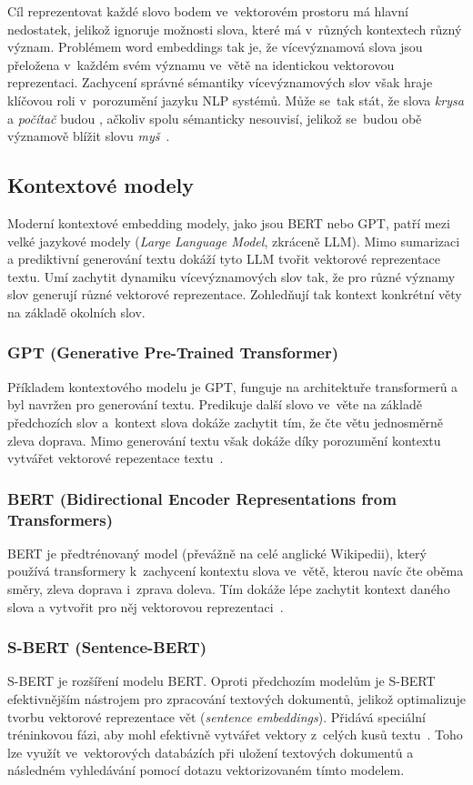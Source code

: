 Cíl reprezentovat každé slovo bodem ve~vektorovém prostoru má hlavní nedostatek, jelikož ignoruje možnosti slova, které má v~různých kontextech různý význam. Problémem word embeddings tak je, že vícevýznamová slova jsou přeložena v~každém svém významu ve~větě na identickou vektorovou reprezentaci. Zachycení správné sémantiky vícevýznamových slov však hraje klíčovou roli v~porozumění jazyku NLP systémů. Může se~tak stát, že slova \textit{krysa} a \textit{počítač} budou , ačkoliv spolu sémanticky nesouvisí, jelikož se~budou obě významově blížit slovu \textit{myš}~\cite{camacho-collados2018_word_sense_embeddings}.

\subsection{Kontextové modely}
Moderní kontextové embedding modely, jako jsou BERT nebo GPT, patří mezi velké jazykové modely (\textit{Large Language Model}, zkráceně LLM). Mimo sumarizaci a prediktivní generování textu dokáží tyto LLM tvořit vektorové reprezentace textu. Umí zachytit dynamiku vícevýznamových slov tak, že pro různé významy slov generují různé vektorové reprezentace. Zohledňují tak kontext konkrétní věty na základě okolních slov.

\subsubsection{GPT (Generative Pre-Trained Transformer)}
Příkladem kontextového modelu je GPT, funguje na architektuře transformerů a byl navržen pro generování textu. Predikuje další slovo ve~věte na základě předchozích slov a~kontext slova dokáže zachytit tím, že čte větu jednosměrně zleva doprava. Mimo generování textu však dokáže díky porozumění kontextu vytvářet vektorové repezentace textu~\cite{yenduri2023_gpt_review}.

\subsubsection{BERT (Bidirectional Encoder Representations from Transformers)}
BERT je předtrénovaný model (převážně na celé anglické Wikipedii), který používá transformery k~zachycení kontextu slova ve~větě, kterou navíc čte oběma směry, zleva doprava i~zprava doleva. Tím dokáže lépe zachytit kontext daného slova a vytvořit pro něj vektorovou reprezentaci~\cite{devlin2018_bert}.

\subsubsection{S-BERT (Sentence-BERT)}
S-BERT je rozšíření modelu BERT. Oproti předchozím modelům je S-BERT efektivnějším nástrojem pro zpracování textových dokumentů, jelikož optimalizuje tvorbu vektorové reprezentace vět (\textit{sentence embeddings}). Přidává speciální tréninkovou fázi, aby mohl efektivně vytvářet vektory z~celých kusů textu~\cite{reimers2019_sbert}. Toho lze využít ve~vektorových databázích při uložení textových dokumentů a následném vyhledávání pomocí dotazu vektorizovaném tímto modelem.

